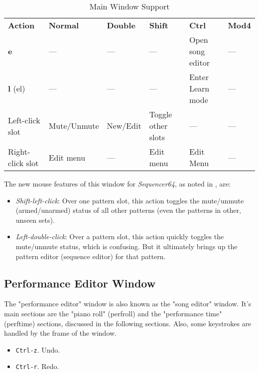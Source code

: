    \begin{table}[H]
      \centering
      \caption{Main Window Support}
      \label{table:main_window_support}
      \begin{tabular}{l l l l l l}
         \textbf{Action} & \textbf{Normal} & \textbf{Double} &
            \textbf{Shift} & \textbf{Ctrl} & \textbf{Mod4} \\
         \textbf{e} & --- & --- & --- & Open song editor & --- \\
         \textbf{l} (el) & --- & --- & --- & Enter Learn mode & --- \\
         Left-click slot & Mute/Unmute & New/Edit & Toggle other slots &
            --- & --- \\
         Right-click slot & Edit menu & --- & Edit menu & Edit Menu &
            --- \\
      \end{tabular}
   \end{table}

   The new mouse features of this window for \textsl{Sequencer64},
   as noted in , are:

   \begin{itemize}
      \item \textsl{Shift-left-click}:
         Over one pattern slot, this action toggles the mute/unmute
         (armed/unarmed) status of all other patterns
         (even the patterns in other, unseen sets).
      \item \textsl{Left-double-click}:
         Over a pattern slot, this action quickly toggles the mute/unmute status,
         which is confusing.  But it ultimately brings up the pattern editor
         (sequence editor) for that pattern.
   \end{itemize}

\subsection{Performance Editor Window}
\label{subsec:kbd_mouse_performance_editor_window}

   The "performance editor" window is also known as the "song editor" window.
   It's main sections are the "piano roll" (perfroll) and the "performance
   time" (perftime) sections, discussed in the following sections.
   Also, some keystrokes are handled by the frame of the window.

   \begin{itemize}
      \item \texttt{Ctrl-z}. Undo.
      \item \texttt{Ctrl-r}. Redo.
   \end{itemize}

